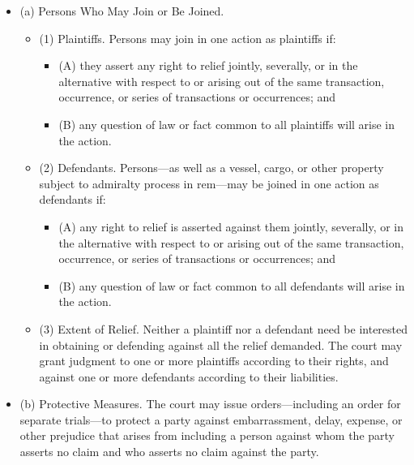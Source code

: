 \documentclass[11pt,letterpaper,twoside]{article}
\providecommand{\tightlist}{%
\setlength{\itemsep}{0em}\setlength{\parskip}{0em}\setlength{\itemindent}{0em}}
\begin{document}
\begin{itemize}
\tightlist
\item
  (a) Persons Who May Join or Be Joined.

  \begin{itemize}
  \tightlist
  \item
    (1) Plaintiffs. Persons may join in one action as plaintiffs if:

    \begin{itemize}
    \tightlist
    \item
      (A) they assert any right to relief jointly, severally, or in the
      alternative with respect to or arising out of the same
      transaction, occurrence, or series of transactions or occurrences;
      and
    \item
      (B) any question of law or fact common to all plaintiffs will
      arise in the action.
    \end{itemize}
  \item
    (2) Defendants. Persons---as well as a vessel, cargo, or other
    property subject to admiralty process in rem---may be joined in one
    action as defendants if:

    \begin{itemize}
    \tightlist
    \item
      (A) any right to relief is asserted against them jointly,
      severally, or in the alternative with respect to or arising out of
      the same transaction, occurrence, or series of transactions or
      occurrences; and
    \item
      (B) any question of law or fact common to all defendants will
      arise in the action.
    \end{itemize}
  \item
    (3) Extent of Relief. Neither a plaintiff nor a defendant need be
    interested in obtaining or defending against all the relief
    demanded. The court may grant judgment to one or more plaintiffs
    according to their rights, and against one or more defendants
    according to their liabilities.
  \end{itemize}
\item
  (b) Protective Measures. The court may issue orders---including an
  order for separate trials---to protect a party against embarrassment,
  delay, expense, or other prejudice that arises from including a person
  against whom the party asserts no claim and who asserts no claim
  against the party.
\end{itemize}
\end{document}
